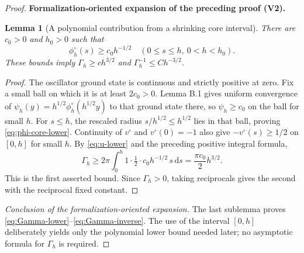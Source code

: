 \documentclass[11pt]{article}
\newtheorem{lemma}[theorem]{Lemma}
\newcommand{\formalisationparentid}{X}
\newenvironment{formalisationaddition}[1]{\par\medskip\begingroup\color{blue}\def\formalisationparentid{#1}\setcounter{formalizationsublemma}{0}\let\lemma\formalizationsublemma\let\endlemma\endformalizationsublemma
  \def\Eo{\mathcal E_h^\circ}\def\EE{\mathcal E_h}\def\phio{\phi_h^\circ}\def\phih{\phi_h}\def\Ho{H_h^{\rm atom}(v^\circ)}\def\Ha{H_h^{\rm atom}}\def\HL{H_h^{L}}\def\Dh{D_h}\def\Log{\operatorname{Log}}\def\ellh{\ell_h}\def\Gp{G_{p,h}}\def\Ast{A_{*,h}}\def\ahat{\widehat{\mathfrak a}_h}\def\ah{\mathfrak a_h}\def\rh{\widehat\rho_h}\def\deltah{\widehat\delta_h}\def\oldref##1{\textup{(##1)}}\def\interface##1{\par\noindent\textit{Analytical interface used here.} ##1\par}\def\finish{\par\noindent\textit{Conclusion of the formalization-oriented expansion.} }\par\noindent\textbf{Formalization-oriented expansion of the preceding proof (V2).}\par\smallskip
}{\par\endgroup\medskip
}
\begin{document}
\begin{proof}
\begin{formalisationaddition}{LB.2}
\begin{lemma}[A polynomial contribution from a shrinking core interval]\label{sublemma:LB-2-lower-bound}
There are $c_0>0$ and $h_0>0$ such that
\begin{equation*}
 \phio(s)\ge c_0h^{-1/2}\quad(0\le s\le h,
 \ 0<h<h_0).
\end{equation*}
These bounds imply $\Gamma_h\ge ch^{3/2}$ and $\Gamma_h^{-1}\le Ch^{-3/2}$.
\end{lemma}
\begin{proof}
The oscillator ground state is continuous and strictly positive at zero. Fix a small ball on which it is at least $2c_0>0$. Lemma B.1 gives uniform convergence of $\psi_h(y)=h^{1/2}\phio(h^{1/2}y)$ to that ground state there, so $\psi_h\ge c_0$ on the ball for small $h$. For $s\le h$, the rescaled radius $s/h^{1/2}\le h^{1/2}$ lies in that ball, proving \eqref{eq:phi-core-lower}. Continuity of $v^\circ$ and $v^\circ(0)=-1$ also give $-v^\circ(s)\ge1/2$ on $[0,h]$ for small $h$. By \eqref{eq:u-lower} and the preceding positive integral formula,
\[
 \Gamma_h\ge 2\pi\int_0^h 1\cdot\tfrac12\cdot c_0h^{-1/2}\,s\,\mathrm ds
 =\frac{\pi c_0}{2}h^{3/2}.
\]
This is the first asserted bound. Since $\Gamma_h>0$, taking reciprocals gives the second with the reciprocal fixed constant.
\end{proof}
\finish The last sublemma proves \eqref{eq:Gamma-lower}--\eqref{eq:Gamma-inverse}. The use of the interval $[0,h]$ deliberately yields only the polynomial lower bound needed later; no asymptotic formula for $\Gamma_h$ is required.
\end{formalisationaddition}

\end{proof}
\end{document}
